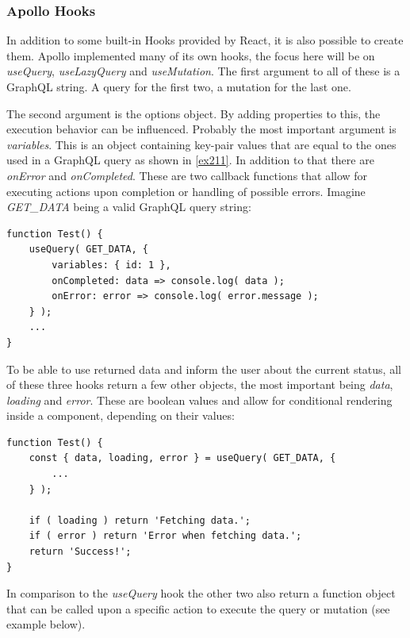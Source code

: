 \subsubsection{Apollo Hooks}
In addition to some built-in Hooks provided by React, it is also possible to create them. Apollo implemented many of its own hooks, the focus here will be on \emph{useQuery}, \emph{useLazyQuery} and \emph{useMutation}.
The first argument to all of these is a GraphQL string. A query for the first two, a mutation for the last one.

The second argument is the options object. By adding properties to this, the execution behavior can be influenced. Probably the most important argument is \emph{variables}. This is an object containing key-pair values that are equal to the ones used in a GraphQL query as shown in \autoref{ex211}. In addition to that there are \emph{onError} and \emph{onCompleted}. These are two callback functions that allow for executing actions upon completion or handling of possible errors. Imagine \emph{GET\_DATA} being a valid GraphQL query string:
\begin{lstlisting}[caption={The useQuery Hook from Apollo}]
function Test() {
	useQuery( GET_DATA, {
		variables: { id: 1 },
		onCompleted: data => console.log( data );
		onError: error => console.log( error.message );
	} );
	...
}
\end{lstlisting}


To be able to use returned data and inform the user about the current status, all of these three hooks return a few other objects, the most important being \emph{data}, \emph{loading} and \emph{error}. These are boolean values and allow for conditional rendering inside a component, depending on their values:
\newpage
\begin{lstlisting}[caption={Demonstration of the useQuery Hook}]
function Test() {
	const { data, loading, error } = useQuery( GET_DATA, {
		...	
	} );
	
	if ( loading ) return 'Fetching data.';
	if ( error ) return 'Error when fetching data.';
	return 'Success!';
}
\end{lstlisting}

In comparison to the \emph{useQuery} hook the other two also return a function object that can be called upon a specific action to execute the query or mutation (see example below).

